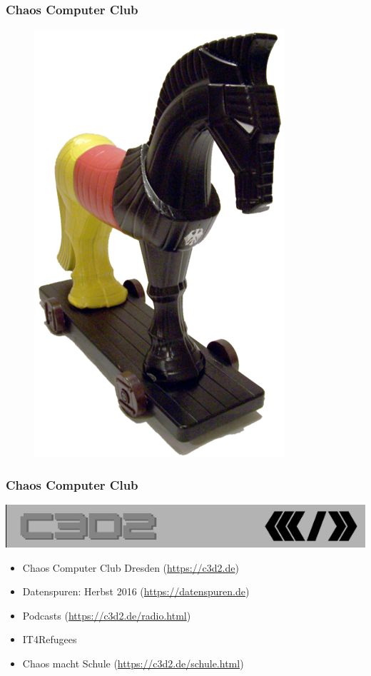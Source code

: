 \documentclass[12pt]{beamer}
\begin{document}
\begin{frame}
  \frametitle{Chaos Computer Club}
  \begin{figure}
    \includegraphics[height=0.7\textheight]{img/trojaner.png}
  \end{figure}
\end{frame}

\begin{frame}
    \frametitle{Chaos Computer Club}
    \begin{center}
	\includegraphics[height=0.1\textheight]{img/c3d2_logo.png}
    \end{center}
    \begin{itemize}
      \item<1-> Chaos Computer Club Dresden (\url{https://c3d2.de})
      \item<2-> Datenspuren: Herbst 2016 (\url{https://datenspuren.de})
      \item<3-> Podcasts (\url{https://c3d2.de/radio.html})
      \item<4-> IT4Refugees
      \item<5-> Chaos macht Schule (\url{https://c3d2.de/schule.html})
    \end{itemize}
\end{frame}
\end{document}
